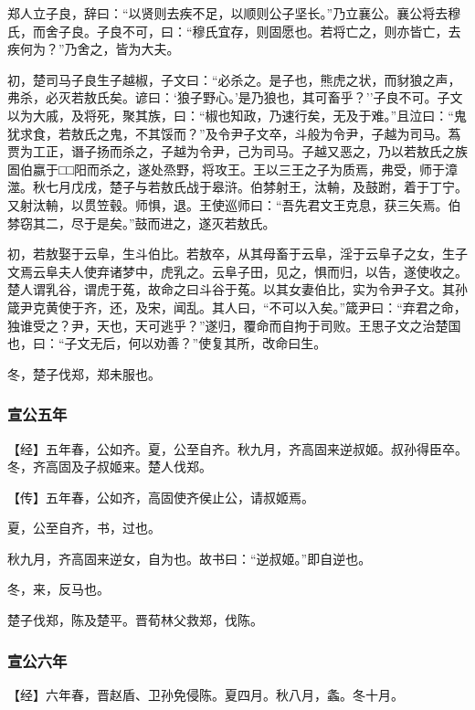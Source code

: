 \documentclass[]{article}
\begin{document}
郑人立子良，辞曰：``以贤则去疾不足，以顺则公子坚长。''乃立襄公。襄公将去穆氏，而舍子良。子良不可，曰：``穆氏宜存，则固愿也。若将亡之，则亦皆亡，去疾何为？''乃舍之，皆为大夫。

初，楚司马子良生子越椒，子文曰：``必杀之。是子也，熊虎之状，而豺狼之声，弗杀，必灭若敖氏矣。谚曰：`狼子野心。'是乃狼也，其可畜乎？''子良不可。子文以为大戚，及将死，聚其族，曰：``椒也知政，乃速行矣，无及于难。''且泣曰：``鬼犹求食，若敖氏之鬼，不其馁而？''及令尹子文卒，斗般为令尹，子越为司马。蒍贾为工正，谮子扬而杀之，子越为令尹，己为司马。子越又恶之，乃以若敖氏之族圄伯嬴于□□阳而杀之，遂处烝野，将攻王。王以三王之子为质焉，弗受，师于漳澨。秋七月戊戌，楚子与若敖氏战于皋浒。伯棼射王，汰輈，及鼓跗，着于丁宁。又射汰輈，以贯笠毂。师惧，退。王使巡师曰：``吾先君文王克息，获三矢焉。伯棼窃其二，尽于是矣。''鼓而进之，遂灭若敖氏。

初，若敖娶于云阜，生斗伯比。若敖卒，从其母畜于云阜，淫于云阜子之女，生子文焉云阜夫人使弃诸梦中，虎乳之。云阜子田，见之，惧而归，以告，遂使收之。楚人谓乳谷，谓虎于菟，故命之曰斗谷于菟。以其女妻伯比，实为令尹子文。其孙箴尹克黄使于齐，还，及宋，闻乱。其人曰，``不可以入矣。''箴尹曰：``弃君之命，独谁受之？尹，天也，天可逃乎？''遂归，覆命而自拘于司败。王思子文之治楚国也，曰：``子文无后，何以劝善？''使复其所，改命曰生。

冬，楚子伐郑，郑未服也。

\hypertarget{header-n1345}{%
\subsubsection{宣公五年}\label{header-n1345}}

【经】五年春，公如齐。夏，公至自齐。秋九月，齐高固来逆叔姬。叔孙得臣卒。冬，齐高固及子叔姬来。楚人伐郑。

【传】五年春，公如齐，高固使齐侯止公，请叔姬焉。

夏，公至自齐，书，过也。

秋九月，齐高固来逆女，自为也。故书曰：``逆叔姬。''即自逆也。

冬，来，反马也。

楚子伐郑，陈及楚平。晋荀林父救郑，伐陈。

\hypertarget{header-n1354}{%
\subsubsection{宣公六年}\label{header-n1354}}

【经】六年春，晋赵盾、卫孙免侵陈。夏四月。秋八月，螽。冬十月。
\end{document}
